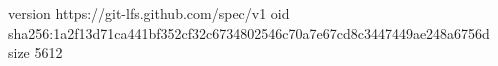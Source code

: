 version https://git-lfs.github.com/spec/v1
oid sha256:1a2f13d71ca441bf352cf32c6734802546c70a7e67cd8c3447449ae248a6756d
size 5612

